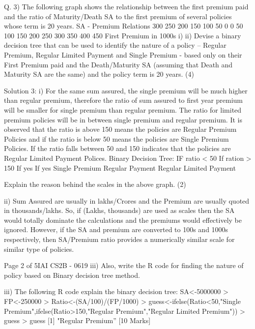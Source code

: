 \documentclass[a4paper,12pt]{article}
\begin{document}
Q. 3) The following graph shows the relationship between the first premium paid and the ratio of
Maturity/Death SA to the first premium of several policies whose term is 20 years.
SA - Premium Relations
300
250
200
150
100
50
0
0
50
100
150
200
250
300
350
400
450
First Premium in 1000s
i)
ii)
Devise a binary decision tree that can be used to identify the nature of a policy – Regular
Premium, Regular Limited Payment and Single Premium - based only on their First
Premium paid and the Death/Maturity SA (assuming that Death and Maturity SA are
the same) and the policy term is 20 years. (4)



\newpage

Solution 3:
i) For the same sum assured, the single premium will be much higher than regular premium, therefore
the ratio of sum assured to first year premium will be smaller for single premium than regular
premium. The ratio for limited premium policies will be in between single premium and regular
premium.
It is observed that the ratio is above 150 means the policies are Regular Premium Policies and if the
ratio is below 50 means the policies are Single Premium Policies. If the ratio falls between 50 and 150
indicates that the policies are Regular Limited Payment Polices.
Binary Decision Tree:
IF ratio < 50
If ration > 150
If yes
If yes
Single Premium
Regular Payment
Regular Limited
Payment


\newpage

Explain the reason behind the scales in the above graph. (2)

ii) Sum Assured are usually in lakhs/Crores and the Premium are usually quoted in thousands/lakhs.
So, if (Lakhs, thousands) are used as scales then the SA would totally dominate the calculations and
the premiums would effectively be ignored. However, if the SA and premium are converted to 100s
and 1000s respectively, then SA/Premium ratio provides a numerically similar scale for similar type
of policies.



\newpage


Page 2 of 5IAI
CS2B - 0619
iii)
Also, write the R code for finding the nature of policy based on Binary decision tree
method.

iii) The following R code explain the binary decision tree:
SA<-5000000
> FP<-250000
> Ratio<-(SA/100)/(FP/1000)
> guess<-ifelse(Ratio<50,"Single Premium",ifelse(Ratio>150,"Regular Premium","Regular Limited
Premium"))
> guess
> guess
[1] "Regular Premium”
[10 Marks]
\end{document}
